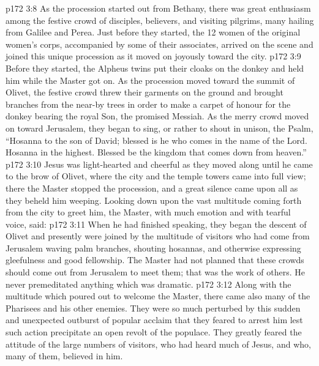 \vs p172 3:8 As the procession started out from Bethany, there was great enthusiasm among the festive crowd of disciples, believers, and visiting pilgrims, many hailing from Galilee and Perea. Just before they started, the 12 women of the original women’s corps, accompanied by some of their associates, arrived on the scene and joined this unique procession as it moved on joyously toward the city.
\vs p172 3:9 Before they started, the Alpheus twins put their cloaks on the donkey and held him while the Master got on. As the procession moved toward the summit of Olivet, the festive crowd threw their garments on the ground and brought branches from the near\hyp{}by trees in order to make a carpet of honour for the donkey bearing the royal Son, the promised Messiah. As the merry crowd moved on toward Jerusalem, they began to sing, or rather to shout in unison, the Psalm, “Hosanna to the son of David; blessed is he who comes in the name of the Lord. Hosanna in the highest. Blessed be the kingdom that comes down from heaven.”
\vs p172 3:10 Jesus was light\hyp{}hearted and cheerful as they moved along until he came to the brow of Olivet, where the city and the temple towers came into full view; there the Master stopped the procession, and a great silence came upon all as they beheld him weeping. Looking down upon the vast multitude coming forth from the city to greet him, the Master, with much emotion and with tearful voice, said: 
\vs p172 3:11 When he had finished speaking, they began the descent of Olivet and presently were joined by the multitude of visitors who had come from Jerusalem waving palm branches, shouting hosannas, and otherwise expressing gleefulness and good fellowship. The Master had not planned that these crowds should come out from Jerusalem to meet them; that was the work of others. He never premeditated anything which was dramatic.
\vs p172 3:12 Along with the multitude which poured out to welcome the Master, there came also many of the Pharisees and his other enemies. They were so much perturbed by this sudden and unexpected outburst of popular acclaim that they feared to arrest him lest such action precipitate an open revolt of the populace. They greatly feared the attitude of the large numbers of visitors, who had heard much of Jesus, and who, many of them, believed in him.
